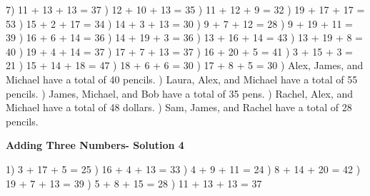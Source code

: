 \documentclass{article}%
\begin{document}
7) 11 + 13 + 13 = 37%
) 12 + 10 + 13 = 35%
) 11 + 12 + 9 = 32%
) 19 + 17 + 17 = 53%
) 15 + 2 + 17 = 34%
) 14 + 3 + 13 = 30%
) 9 + 7 + 12 = 28%
) 9 + 19 + 11 = 39%
) 16 + 6 + 14 = 36%
) 14 + 19 + 3 = 36%
) 13 + 16 + 14 = 43%
) 13 + 19 + 8 = 40%
) 19 + 4 + 14 = 37%
) 17 + 7 + 13 = 37%
) 16 + 20 + 5 = 41%
) 3 + 15 + 3 = 21%
) 15 + 14 + 18 = 47%
) 18 + 6 + 6 = 30%
) 17 + 8 + 5 = 30%
) Alex, James, and Michael have a total of 40 pencils.%
) Laura, Alex, and Michael have a total of 55 pencils.%
) James, Michael, and Bob have a total of 35 pens.%
) Rachel, Alex, and Michael have a total of 48 dollars.%
) Sam, James, and Rachel have a total of 28 pencils.%
\newline%
\newpage%
\large%
\begin{center}%
\textbf{Adding Three Numbers- Solution 4}%
\newline%
\end{center} \normalsize%
1) 3 + 17 + 5 = 25%
) 16 + 4 + 13 = 33%
) 4 + 9 + 11 = 24%
) 8 + 14 + 20 = 42%
) 19 + 7 + 13 = 39%
) 5 + 8 + 15 = 28%
) 11 + 13 + 13 = 37%
\newline%
\end{document}
